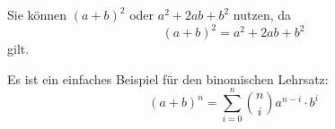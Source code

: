 \documentclass[12pt,a5paper]{book}
\begin{document}
Sie können $(a + b)^2$ oder $a^2 + 2ab + b^2$ nutzen, da
\[ (a + b)^2 = a^2 + 2ab + b^2 \] gilt.

Es ist ein einfaches Beispiel für den binomischen Lehrsatz:
\begin{equation}
(a+b)^n = \sum_{i=0}^n {n \choose i} a^{n-i} \cdot b^i
\end{equation}
\end{document}

